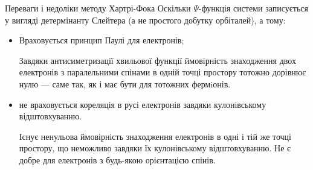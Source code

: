 \documentclass[10pt]{beamer}
\begin{document}
\begin{frame}{Переваги і недоліки методу Хартрі-Фока}{}
	Оскільки $\Psi$-функція системи записується у вигляді детермінанту Слейтера (а не простого добутку орбіталей), а тому:
	\begin{itemize}
		\item Враховується принцип Паулі для електронів;

		      {\footnotesize Завдяки антисиметризації хвильової функції ймовірність знаходження двох електронів з паралельними спінами в одній точці простору тотожно дорівнює нулю --- саме так, як і має бути для тотожних фермiонів.}
		\item не враховується кореляція в русі електронів завдяки кулонівському відштовхуванню.

		      {\footnotesize  Існує ненульова ймовірність знаходження електронів в одні і тій же точці простору, що неможливо завдяки їх кулонівському відштовхуванню. Не є добре для електронів з будь-якою орієнтацією спінів.}
	\end{itemize}
\end{frame}
\end{document}

